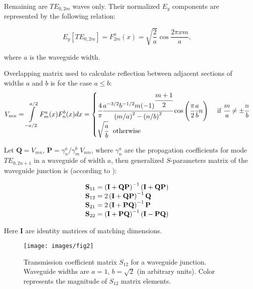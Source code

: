 \documentclass{pj}
\begin{document}
Remaining are $TE_{0, 2m}$ waves only. Their
normalized $E_{y}$ components are represented by the following
relation:

\begin{equation}
  \label{eq:1}
  E_y[TE_{0, 2m}] = F_{2m}^a(x) = \sqrt{\frac{2}{a}} \cos{\frac{2 \pi x m}{a}},
\end{equation}

where $a$ is the waveguide width. 

Overlapping matrix used to calculate reflection between adjacent
sections of widths $a$ and $b$ is for the case $a \le b$:
\begin{equation}
  \label{eq:2}
  V_{mn} = \int\limits_{-a/2}^{a/2}F_m^a(x) F_n^b(x) dx =
  \begin{cases}
    \cfrac{4}{\pi} \cfrac{a^{-3/2} b^{-1/2} m
      (-1)^{\cfrac{m+1}{2}}}{\left(m/a\right)^2 -
      \left(n/b\right)^2} \cos{\left(\cfrac{\pi}{2}\cfrac{a}{b}n\right)}& \text{ if }\cfrac{m}{a} \ne \pm \cfrac{n}{b} \\
    \sqrt{\cfrac{a}{b}}~\text{ otherwise}
  \end{cases}
\end{equation}

Let $\mathbf{Q} = V_{mn}$,
$\mathbf{P} = \gamma_n^a/\gamma_m^b V_{nm}$, where $\gamma_n^a$ are
the propagation coefficients for mode $TE_{0, 2n+1}$ in a waveguide of
width $a$, then generalized $S$-parameters matrix of the waveguide
junction is (according to \cite{conciauro2000advanced}):

\begin{equation}
  \label{eq:3}
  \begin{array}{r@{}l}
    \mathbf{S}_{11} &{}= \left(\mathbf{I} + \mathbf{Q P}\right)^{-1} \left(\mathbf{I} + \mathbf{Q P}\right) \\
    \mathbf{S}_{12} &{}= 2\left(\mathbf{I} + \mathbf{Q P}\right)^{-1}\mathbf{Q} \\
    \mathbf{S}_{21} &{}= 2\left(\mathbf{I} + \mathbf{P Q}\right)^{-1}\mathbf{P} \\
    \mathbf{S}_{22} &{}= \left(\mathbf{I} + \mathbf{P Q}\right)^{-1}\left(\mathbf{I} - \mathbf{P Q}\right)
  \end{array}
\end{equation}

Here $\mathbf{I}$ are identity matrices of matching dimensions.

\begin{figure}
  \texttt{[image: images/fig2]}
  \caption{Transmission coefficient matrix $S_{12}$ for a waveguide
    junction. Waveguide widths are $a=1$, $b=\sqrt{2}$ (in arbitrary
    units). Color represents the magnitude of $S_{12}$ matrix elements.}
  \label{fig:2}
\end{figure}
\end{document}
